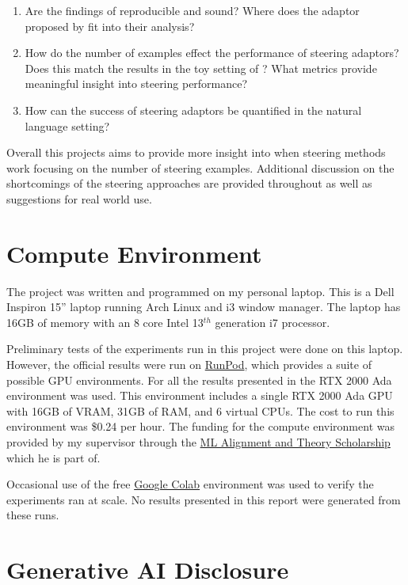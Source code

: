 \begin{enumerate}[nolistsep]
    \item Are the findings of \citet{steering-clear} reproducible and sound? Where does the adaptor proposed by \citet{ace} fit into their analysis?
    \item How do the number of examples effect the performance of steering adaptors? Does this match the results in the toy setting of \citet{steering-clear}? What metrics provide meaningful insight into steering performance?
    \item How can the success of steering adaptors be quantified in the natural language setting?
\end{enumerate}

Overall this projects aims to provide more insight into when steering methods work focusing on the number of steering examples.
Additional discussion on the shortcomings of the steering approaches are provided throughout as well as suggestions for real world use.

\section{Compute Environment}

The project was written and programmed on my personal laptop.
This is a Dell Inspiron 15'' laptop running Arch Linux and i3 window manager.
The laptop has 16GB of memory with an 8 core Intel 13$^{th}$ generation i7 processor.

Preliminary tests of the experiments run in this project were done on this laptop.
However, the official results were run on \href{https://www.runpod.io/}{RunPod}, which provides a suite of possible GPU environments.
For all the results presented in  the RTX 2000 Ada environment was used.
This environment includes a single RTX 2000 Ada GPU with 16GB of VRAM, 31GB of RAM, and 6 virtual CPUs.
The cost to run this environment was \$0.24 per hour.
The funding for the compute environment was provided by my supervisor through the \href{https://www.matsprogram.org/}{ML Alignment and Theory Scholarship} which he is part of.

Occasional use of the free \href{https://colab.research.google.com/}{Google Colab} environment was used to verify the experiments ran at scale.
No results presented in this report were generated from these runs.

\section{Generative AI Disclosure}

